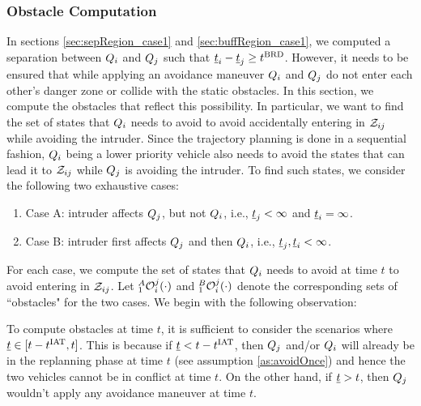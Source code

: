 \subsubsection{Obstacle Computation} \label{sec:intruderObs_case1}
In sections \ref{sec:sepRegion_case1} and \ref{sec:buffRegion_case1}, we computed a separation between $Q_i$ and $Q_j$ such that $\underline{t}_i - \underline{t}_j \geq t^\text{BRD}$. However, it needs to be ensured that while applying an avoidance maneuver $Q_i$ and $Q_j$ do not enter each other's danger zone or collide with the static obstacles. In this section, we compute the obstacles that reflect this possibility. In particular, we want to find the set of states that $Q_i$ needs to avoid to avoid accidentally entering in $\mathcal{Z}_{ij}$ while avoiding the intruder. Since the trajectory planning is done in a sequential fashion, $Q_i$ being a lower priority vehicle also needs to avoid the states that can lead it to $\mathcal{Z}_{ij}$ while $Q_j$ is avoiding the intruder. To find such states, we consider the following two exhaustive cases:
\begin{enumerate}
\item Case A: intruder affects $Q_j$, but not $Q_i$, i.e., $\underline{t}_j < \infty$ and $\underline{t}_i = \infty$.
\item Case B: intruder first affects $Q_j$ and then $Q_i$, i.e., $\underline{t}_j, \underline{t}_i < \infty$.
\end{enumerate}
For each case, we compute the set of states that $Q_i$ needs to avoid at time $t$ to avoid entering in $\mathcal{Z}_{ij}$. Let $_1^A\mathcal{O}_i^j(\cdot)$ and $_1^B\mathcal{O}_i^j(\cdot)$ denote the corresponding sets of ``obstacles" for the two cases. We begin with the following observation: 
\begin{observation} \label{obs1_case1Obs}
To compute obstacles at time $t$, it is sufficient to consider the scenarios where $\underline{t} \in [t-t^\text{IAT}, t]$. This is because if $\underline{t} < t - t^\text{IAT}$, then $Q_j$ and/or $Q_i$ will already be in the replanning phase at time $t$ (see assumption \ref{as:avoidOnce}) and hence the two vehicles cannot be in conflict at time $t$. On the other hand, if $\underline{t} > t$, then $Q_j$ wouldn't apply any avoidance maneuver at time $t$. 
\end{observation}

